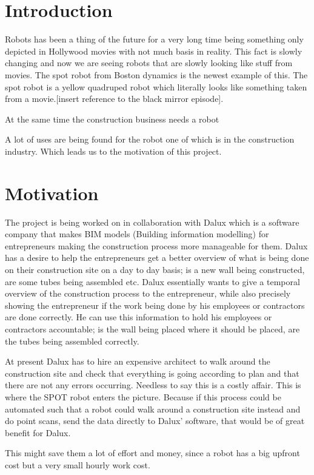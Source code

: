 \section{Introduction}
Robots has been a thing of the future for a very long time being something only depicted in Hollywood movies with not much basis in reality. This fact is slowly changing and now we are seeing robots that are slowly looking like stuff from movies. 
The spot robot from Boston dynamics is the newest example of this. The spot robot is a yellow quadruped robot which literally looks like something taken from a movie.[insert reference to the black mirror episode].

At the same time the construction business needs a robot 

A lot of uses are being found for the robot one of which is in the construction industry. Which leads us to the motivation of this project.


\section{Motivation}
The project is being worked on in collaboration with Dalux which is a software company that makes BIM models (Building information modelling) for entrepreneurs making the construction process more manageable for them. 
Dalux has a desire to help the entrepreneurs get a better overview of what is being done on their construction site on a day to day basis; is a new wall being constructed, are some tubes being assembled etc. 
Dalux essentially wants to give a temporal overview of the construction process to the entrepreneur, while also precisely showing the entrepreneur if the work being done by his employees or contractors are done correctly.
He can use this information to hold his employees or contractors accountable; is the wall being placed where it should be placed, are the tubes being assembled correctly.

At present Dalux has to hire an expensive architect to walk around the construction site and check that everything is going according to plan and that there are not any errors occurring. Needless to say this is a costly affair.
This is where the SPOT robot enters the picture. Because if this process could be automated such that a robot could walk around a construction site instead and do point scans, send the data directly to Dalux’ software, that would be of great benefit for Dalux. 

This might save them a lot of effort and money, since a robot has a big upfront cost but a very small hourly work cost.


